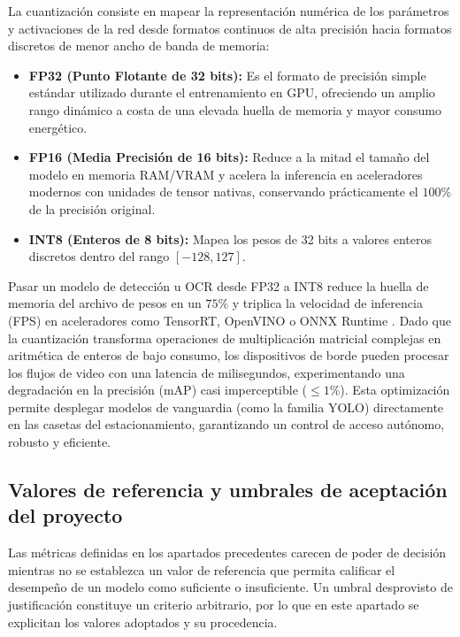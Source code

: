La cuantización consiste en mapear la representación numérica de los parámetros y
activaciones de la red desde formatos continuos de alta precisión hacia formatos
discretos de menor ancho de banda de memoria:
\begin{itemize}
    \item \textbf{FP32 (Punto Flotante de 32 bits):} Es el formato de precisión
        simple estándar utilizado durante el entrenamiento en GPU, ofreciendo un
        amplio rango dinámico a costa de una elevada huella de memoria y mayor
        consumo energético.

    \item \textbf{FP16 (Media Precisión de 16 bits):} Reduce a la mitad el tamaño
        del modelo en memoria RAM/VRAM y acelera la inferencia en aceleradores
        modernos con unidades de tensor nativas, conservando prácticamente el
        $100\%$ de la precisión original.

    \item \textbf{INT8 (Enteros de 8 bits):} Mapea los pesos de 32 bits a valores
        enteros discretos dentro del rango $[-128, 127]$. 
\end{itemize}

Pasar un modelo de detección u OCR desde FP32 a INT8 reduce la huella de memoria
del archivo de pesos en un $75\%$ y triplica la velocidad de inferencia (FPS) en
aceleradores como TensorRT, OpenVINO o ONNX Runtime
\cite{sapkota2026yolo26,jocher2026yolo26}. Dado que la cuantización
transforma operaciones de multiplicación matricial complejas en aritmética de
enteros de bajo consumo, los dispositivos de borde pueden procesar los flujos de
video con una latencia de milisegundos, experimentando una degradación en la
precisión (mAP) casi imperceptible ($\le 1\%$). Esta optimización permite
desplegar modelos de vanguardia (como la familia YOLO) directamente en las
casetas del estacionamiento, garantizando un control de acceso autónomo, robusto
y eficiente.

\subsection{Valores de referencia y umbrales de aceptación del proyecto}

Las métricas definidas en los apartados precedentes carecen de poder de decisión
mientras no se establezca un valor de referencia que permita calificar el
desempeño de un modelo como suficiente o insuficiente. Un umbral desprovisto de
justificación constituye un criterio arbitrario, por lo que en este apartado se
explicitan los valores adoptados y su procedencia.

